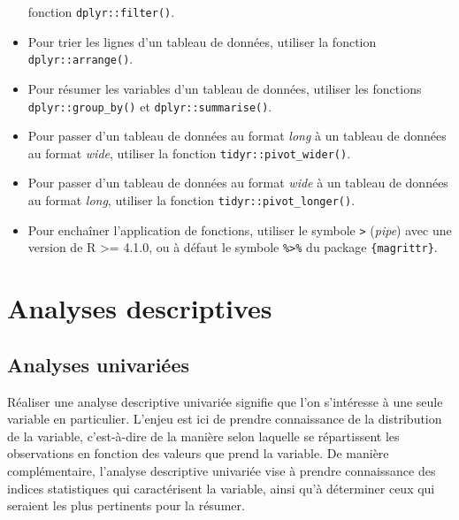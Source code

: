 \documentclass[
  letterpaper,
]{book}
\begin{document}
\begin{itemize}
  fonction \texttt{dplyr::filter()}.
\item
  Pour trier les lignes d'un tableau de données, utiliser la fonction
  \texttt{dplyr::arrange()}.
\item
  Pour résumer les variables d'un tableau de données, utiliser les
  fonctions \texttt{dplyr::group\_by()} et \texttt{dplyr::summarise()}.
\item
  Pour passer d'un tableau de données au format \emph{long} à un tableau
  de données au format \emph{wide}, utiliser la fonction
  \texttt{tidyr::pivot\_wider()}.
\item
  Pour passer d'un tableau de données au format \emph{wide} à un tableau
  de données au format \emph{long}, utiliser la fonction
  \texttt{tidyr::pivot\_longer()}.
\item
  Pour enchaîner l'application de fonctions, utiliser le symbole
  \texttt{\textbar{}\textgreater{}} (\emph{pipe}) avec une version de R
  \textgreater= 4.1.0, ou à défaut le symbole
  \texttt{\%\textgreater{}\%} du package \texttt{\{magrittr\}}.
\end{itemize}

\part{Analyses descriptives}

\chapter{Analyses univariées}\label{analyses-univariuxe9es}

Réaliser une analyse descriptive univariée signifie que l'on s'intéresse
à une seule variable en particulier. L'enjeu est ici de prendre
connaissance de la distribution de la variable, c'est-à-dire de la
manière selon laquelle se répartissent les observations en fonction des
valeurs que prend la variable. De manière complémentaire, l'analyse
descriptive univariée vise à prendre connaissance des indices
statistiques qui caractérisent la variable, ainsi qu'à déterminer ceux
qui seraient les plus pertinents pour la résumer.
\end{document}
